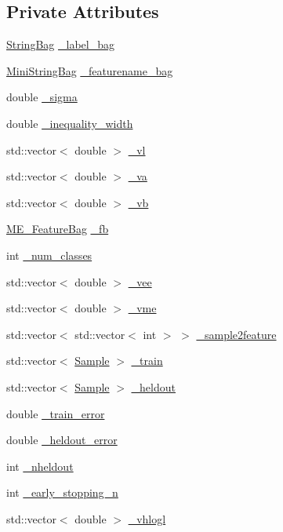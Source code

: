 \subsection*{Private Attributes}
\begin{CompactItemize}
\item 
\hyperlink{structME__Model_1_1StringBag}{StringBag} \hyperlink{classME__Model_4182ebe09a43ab1e94d6b438d79c3075}{\_\-label\_\-bag}
\item 
\hyperlink{structME__Model_1_1MiniStringBag}{MiniStringBag} \hyperlink{classME__Model_97517bda659bd3137e6e94810f08897d}{\_\-featurename\_\-bag}
\item 
double \hyperlink{classME__Model_da41f84f6e6c25acec3698903f3a5cb3}{\_\-sigma}
\item 
double \hyperlink{classME__Model_8fe5e308a2901c6792abe6c305491bcd}{\_\-inequality\_\-width}
\item 
std::vector$<$ double $>$ \hyperlink{classME__Model_a0dc1dcca7431b816b27c1d7c9f0379a}{\_\-vl}
\item 
std::vector$<$ double $>$ \hyperlink{classME__Model_30e8d601c952bf0aa22da5837149e7a1}{\_\-va}
\item 
std::vector$<$ double $>$ \hyperlink{classME__Model_85968df26e2c2515e94e9d7dc5904d80}{\_\-vb}
\item 
\hyperlink{structME__Model_1_1ME__FeatureBag}{ME\_\-FeatureBag} \hyperlink{classME__Model_b52455eefd6359c8d38631f712a07c5c}{\_\-fb}
\item 
int \hyperlink{classME__Model_7a85f402ac9fea030c49f7c6216df686}{\_\-num\_\-classes}
\item 
std::vector$<$ double $>$ \hyperlink{classME__Model_6d1c21872d8899cd512ce560216bcfda}{\_\-vee}
\item 
std::vector$<$ double $>$ \hyperlink{classME__Model_f73cc90b01028ab54527df94d6c8a123}{\_\-vme}
\item 
std::vector$<$ std::vector$<$ int $>$ $>$ \hyperlink{classME__Model_5d08a0ae3292a2fecf9473aee17660a8}{\_\-sample2feature}
\item 
std::vector$<$ \hyperlink{structME__Model_1_1Sample}{Sample} $>$ \hyperlink{classME__Model_01bbc4b24d88cda6c77db3ef17f48f19}{\_\-train}
\item 
std::vector$<$ \hyperlink{structME__Model_1_1Sample}{Sample} $>$ \hyperlink{classME__Model_ee10259b3dbbc99acb9c0f0e200b598b}{\_\-heldout}
\item 
double \hyperlink{classME__Model_aab235eaccf24824812370d60ca079e4}{\_\-train\_\-error}
\item 
double \hyperlink{classME__Model_daf5973e7d0bf53c3d747da90dc20036}{\_\-heldout\_\-error}
\item 
int \hyperlink{classME__Model_ba7ea42febb256bf94f54245255a34a5}{\_\-nheldout}
\item 
int \hyperlink{classME__Model_8d93484c679c42bbedf68c8a6bde5d9c}{\_\-early\_\-stopping\_\-n}
\item 
std::vector$<$ double $>$ \hyperlink{classME__Model_ff95546f6b66221b240b2f2316f55aac}{\_\-vhlogl}
\end{CompactItemize}


